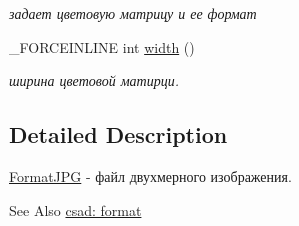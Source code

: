 \begin{DoxyCompactItemize}
\begin{DoxyCompactList}\small\item\em задает цветовую матрицу и ее формат \end{DoxyCompactList}\item 
\hypertarget{classcsad_1_1_format_j_p_g_a1a3684e2216ec08fee5d016bf3a12338}{\-\_\-\-F\-O\-R\-C\-E\-I\-N\-L\-I\-N\-E int \hyperlink{classcsad_1_1_format_j_p_g_a1a3684e2216ec08fee5d016bf3a12338}{width} ()}\label{classcsad_1_1_format_j_p_g_a1a3684e2216ec08fee5d016bf3a12338}

\begin{DoxyCompactList}\small\item\em ширина цветовой матирци. \end{DoxyCompactList}\end{DoxyCompactItemize}


\subsection{Detailed Description}
\hyperlink{classcsad_1_1_format_j_p_g}{Format\-J\-P\-G} -\/ файл двухмерного изображения. 

\begin{DoxySeeAlso}{See Also}
\hyperlink{group__format}{csad\-: format} 
\end{DoxySeeAlso}

